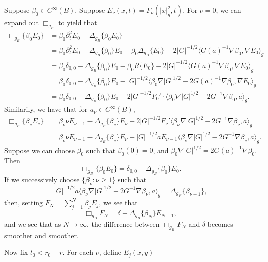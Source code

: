 Suppose $\beta_0 \in C^\infty(B)$. Suppose $E_\nu(x,t) = F_\nu(|x|_g^2,t)$. For $\nu = 0$, we can expand out $\Box_{g_B}$ to yield that
\begin{align*}
    \Box_{g_B} \{ \beta_0 E_0 \} &= \beta_0 \partial_t^2 E_0 - \Delta_{g_B} \{ \beta_0 E_0 \}\\
    &= \beta_0 \partial_t^2 E_0 - \Delta_{g_B} \{ \beta_0 \} E_0 - \beta_0 \Delta_{g_B} \{ E_0 \} - 2 |G|^{-1/2} \langle G(a)^{-1} \nabla \beta_0, \nabla E_0 \rangle_g\\
    &= \beta_0 \delta_{0,0} - \Delta_{g_B} \{ \beta_0 \} E_0 - \beta_0 R \{ E_0 \} - 2 |G|^{-1/2} \langle G(a)^{-1} \nabla \beta_0, \nabla E_0 \rangle_g\\
    &= \beta_0 \delta_{0,0} - \Delta_{g_B} \{ \beta_0 \} E_0 - |G|^{-1/2} \langle \beta_0 \nabla |G|^{1/2} - 2 G(a)^{-1} \nabla \beta_0 , \nabla E_0 \rangle_g\\
    &= \beta_0 \delta_{0,0} - \Delta_{g_B} \{ \beta_0 \} E_0 - 2 |G|^{-1/2} F_0' \cdot \langle \beta_0 \nabla |G|^{1/2} - 2 G^{-1} \nabla \beta_0 , a \rangle_g.
\end{align*}
%
Similarily, we have that for $a_\nu \in C^\infty(B)$,
%
\begin{align*}
    \Box_{g_B} \{ \beta_\nu E_\nu \} &= \beta_\nu \nu E_{\nu-1} - \Delta_{g_B} \{ \beta_\nu \} E_\nu - 2 |G|^{-1/2} F_\nu' \langle \beta_\nu \nabla |G|^{1/2} - 2 G^{-1} \nabla \beta_\nu, a \rangle_g\\
    &= \beta_\nu \nu E_{\nu-1} - \Delta_{g_B} \{ \beta_\nu \} E_\nu + |G|^{-1/2} a E_{\nu-1} \langle \beta_\nu \nabla |G|^{1/2} - 2 G^{-1} \nabla \beta_\nu, a \rangle_g.
\end{align*}
%
Suppose we can choose $\beta_0$ such that $\beta_0(0) = 0$, and $\beta_0 \nabla |G|^{1/2} = 2 G(a)^{-1} \nabla \beta_0$. Then
%
\[ \Box_{g_B} \{ \beta_0 E_0 \} = \delta_{0,0} - \Delta_{g_B} \{ \beta_0 \} E_0. \]
%
If we successively choose $\{ \beta_\nu : \nu \geq 1 \}$ such that
%
\[ |G|^{-1/2} a \langle \beta_\nu \nabla |G|^{1/2} - 2 G^{-1} \nabla \beta_\nu, a \rangle_g = \Delta_{g_B} \{ \beta_{\nu-1} \}, \]
%
then, setting $F_N = \sum_{j = 1}^N \beta_j E_j$, we see that
%
\[ \Box_{g_B} F_N = \delta - \Delta_{g_B} \{ \beta_N \} E_{N+1}, \]
%
and we see that as $N \to \infty$, the difference between $\Box_{g_B} F_N$ and $\delta$ becomes smoother and smoother.

Now fix $t_0 < r_0 - r$. For each $\nu$, define $E_j(x,y)$


